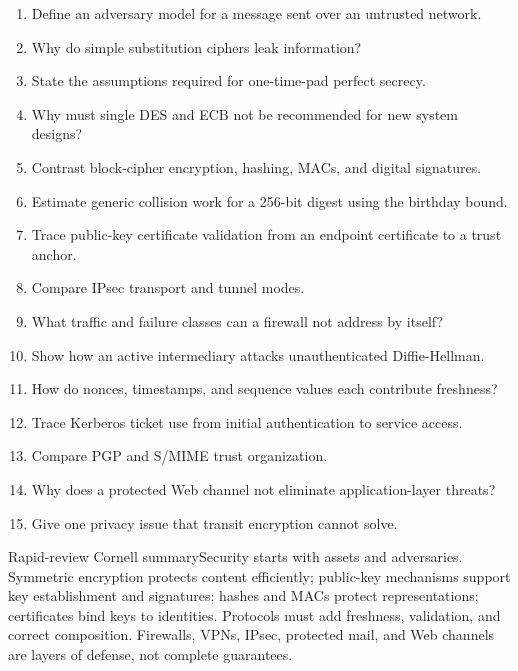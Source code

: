 \documentclass[10pt,letterpaper]{article}
\begin{document}

\begin{enumerate}
  \item Define an adversary model for a message sent over an untrusted network.
  \item Why do simple substitution ciphers leak information?
  \item State the assumptions required for one-time-pad perfect secrecy.
  \item Why must single DES and ECB not be recommended for new system designs?
  \item Contrast block-cipher encryption, hashing, MACs, and digital signatures.
  \item Estimate generic collision work for a 256-bit digest using the birthday bound.
  \item Trace public-key certificate validation from an endpoint certificate to a trust anchor.
  \item Compare IPsec transport and tunnel modes.
  \item What traffic and failure classes can a firewall not address by itself?
  \item Show how an active intermediary attacks unauthenticated Diffie-Hellman.
  \item How do nonces, timestamps, and sequence values each contribute freshness?
  \item Trace Kerberos ticket use from initial authentication to service access.
  \item Compare PGP and S/MIME trust organization.
  \item Why does a protected Web channel not eliminate application-layer threats?
  \item Give one privacy issue that transit encryption cannot solve.
\end{enumerate}
\begin{CornellSummaryBox}{Rapid-review Cornell summary}Security starts with assets and adversaries. Symmetric encryption protects content efficiently; public-key mechanisms support key establishment and signatures; hashes and MACs protect representations; certificates bind keys to identities. Protocols must add freshness, validation, and correct composition. Firewalls, VPNs, IPsec, protected mail, and Web channels are layers of defense, not complete guarantees.\end{CornellSummaryBox}
\end{document}
